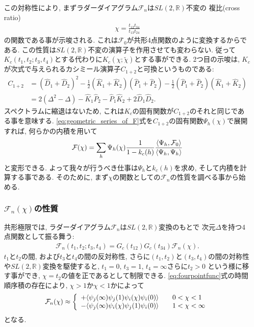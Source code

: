 この対称性により, まずラダーダイアグラム$\mathcal{F}_n$は$SL(2, \mathbb{R})$不変の
複比(cross ratio)
\begin{align}
	\chi = \frac{t_{12}t_{34}}{t_{13}t_{24}}
\end{align}
の関数である事が示唆される. 
これは$\mathcal{F}_0$が共形4点関数のように変換するからである. 
この性質は$SL(2, \mathbb{R})$不変の演算子を作用させても変わらない. 
従って$K_c(t_1, t_2; t_3, t_4)$とする代わりに$K_c(\chi; \tilde{\chi})$とする事ができる. 
2つ目の示唆は, $K_c$が次式で与えられるカシミール演算子$C_{1+2}$と可換というものである:
\begin{align}
	C_{1+2}
	&= (\hat{D}_1 + \hat{D}_2)^2
	- \frac{1}{2}(\hat{K}_1 + \hat{K}_2)(\hat{P}_1 + \hat{P}_2)
	- \frac{1}{2}(\hat{P}_1 + \hat{P}_2)(\hat{K}_1 + \hat{K}_2)\nonumber\\
	&= 2(\Delta^2 - \Delta) - \hat{K}_1\hat{P}_2 - \hat{P}_1\hat{K}_2 + 2\hat{D}_1\hat{D}_2.
	\label{eq:casimir_operator}
\end{align}
スペクトラムに縮退はないため, これは$K_c$の固有関数が$C_{1+2}$のそれと同じである事を意味する. 
\eqref{eq:geometric_series_of_F}式を$C_{1+2}$の固有関数$\Psi_h(\chi)$で展開すれば, 
何らかの内積を用いて
\begin{align}
	\mathcal{F}(\chi)
	= \sum_h \Psi_h(\chi)\frac{1}{1 - k_c(h)}
		\frac{\langle \Psi_h, \mathcal{F}_0 \rangle}{\langle \Psi_h, \Psi_h \rangle}
	\label{eq:final_F_chi}
\end{align}
と変形できる. 
よって我々が行うべき仕事は$\Psi_h$と$k_c(h)$を求め, そして内積を計算する事である. 
そのために, まず$\chi$の関数としての$\mathcal{F}_n$の性質を調べる事から始める. 

\subsubsection{$\mathcal{F}_n(\chi)$の性質}
共形極限では, ラダーダイアグラム$\mathcal{F}_n$は$SL(2, \mathbb{R})$変換のもとで
次元$\Delta$を持つ4点関数として振る舞う:
\begin{align}
	\mathcal{F}_n(t_1, t_2; t_3, t_4)
	= G_c(t_{12})G_c(t_{34})\mathcal{F}_n(\chi).
\end{align}
$t_1$と$t_2$の間, および$t_3$と$t_4$の間の反対称性, さらに$(t_1, t_2)$と$(t_3, t_4)$の間の対称性
や$SL(2, \mathbb{R})$変換を駆使すると, $t_1 = 0$, $t_3 = 1$, $t_4 = \infty$さらに$t_2 > 0$
という様に移す事ができ, $\chi = t_2$の値を正であるとして制限できる. 
\eqref{eq:fourpointfunc}式の時間順序積の存在により, $\chi > 1$か$\chi < 1$かによって
\begin{align}
	\mathcal{F}_n(\chi)
	\approx \left\{
		\begin{array}{l}
			+\langle \psi_j(\infty)\psi_j(1)\psi_i(\chi)\psi_i(0) \rangle\hspace{20pt}
			0 < \chi < 1\\
			-\langle \psi_j(\infty)\psi_i(\chi)\psi_j(1)\psi_i(0) \rangle\hspace{20pt}
			1 < \chi < \infty
		\end{array}
	\right.
\end{align}
となる. 

